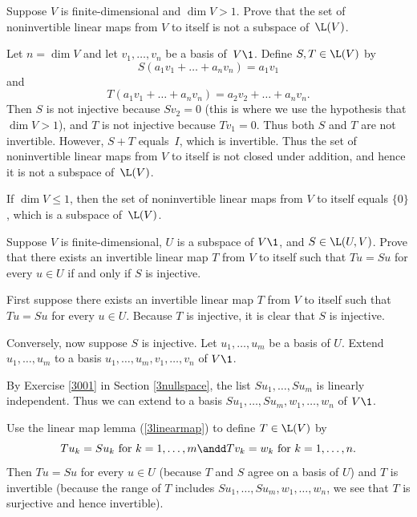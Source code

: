 \exercise
Suppose $V$ is finite-dimensional and $\dim V > 1$. Prove that the set of
noninvertible linear maps from $V$ to itself is  not a subspace of~$\L(V)$.

\begin{Solution}
Let $n = \dim V$ and let
$v_1, \dots, v_n$ be a basis of~$V\1$.  Define $S, T \in \L(V)$ by
\[
S(a_1 v_1 + \dots + a_n v_n) = a_1 v_1
\]
and
\[
T(a_1 v_1 + \dots + a_n v_n) = a_2 v_2 + \dots + a_n v_n.
\]
Then $S$ is not injective because $Sv_2 = 0$ (this is where we use the hypothesis
that $\dim V > 1$), and $T$ is not injective because $Tv_1 = 0$.  Thus both $S$ and
$T$ are not invertible.  However, $S + T$ equals~$I$, which is invertible.  Thus
the set of noninvertible linear maps from $V$ to itself is  not closed under addition, and hence
it is not a subspace of~$\L(V)$.

\Comment
If $\dim V \le 1$, then the set of noninvertible linear maps from $V$ to itself equals $\{0\}$,
which is a subspace of~$\L(V)$.
\end{Solution}

\exercise
Suppose $V$ is finite-dimensional, $U$ is a subspace of $V\1$, and $S \in \L(U, V)$. Prove that there exists an invertible linear map $T$ from $V$ to itself such that $Tu = Su$ for every $u \in U$ if and only if $S$ is injective.\label{3inv}

\begin{Solution}
First suppose there exists an invertible linear map $T$ from $V$ to itself such that $Tu = Su$ for every $u \in U$. Because $T$ is injective, it is clear that $S$ is injective.

Conversely, now suppose $S$ is injective. Let $u_1, \dots, u_m$ be a basis of $U$. Extend $u_1, \dots, u_m$ to a basis $u_1, \dots, u_m, v_1, \dots, v_n$ of $V\1$.

By Exercise \ref{3001} in Section \ref{3nullspace}, the list $Su_1, \dots, Su_m$ is linearly independent. Thus we can extend to a basis $Su_1, \dots, Su_m, w_1, \dots, w_n$ of $V\1$.

Use the linear map lemma (\ref{3linearmap}) to define $T \in \L(V)$ by
\[
Tu_k = Su_k \text{ for } k = 1, \dots, m \andd Tv_k = w_k \text{ for } k = 1, \dots, n.
\]
Then $Tu = Su$ for every $u \in U$ (because $T$ and $S$ agree on a basis of $U$) and $T$ is invertible (because the range of $T$ includes $Su_1, \dots, Su_m, w_1, \dots, w_n$, we see that $T$ is surjective and hence invertible).
\end{Solution}

